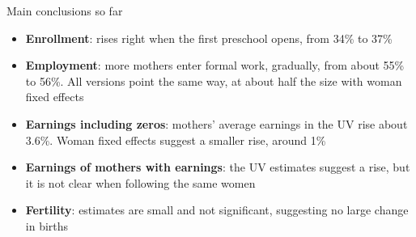 \documentclass[aspectratio=169,10pt]{beamer}
\newcommand{\takeaway}[1]{\par\vspace{6pt}{\small\textcolor{steel}{$\Rightarrow$}\ \textbf{\textcolor{navy}{#1}}}}
\begin{document}
\begin{frame}{Main conclusions so far}
\begin{itemize}
  \small
  \item \textbf{Enrollment}: rises right when the first preschool opens, from 34\% to 37\%
  \item \textbf{Employment}: more mothers enter formal work, gradually, from about 55\% to 56\%. All versions point the same way, at about half the size with woman fixed effects
  \item \textbf{Earnings including zeros}: mothers' average earnings in the UV rise about 3.6\%. Woman fixed effects suggest a smaller rise, around 1\%
  \item \textbf{Earnings of mothers with earnings}: the UV estimates suggest a rise, but it is not clear when following the same women
  \item \textbf{Fertility}: estimates are small and not significant, suggesting no large change in births
\end{itemize}
\takeaway{Openings bring children into preschool right away and mothers into formal work gradually, with no clear change in births.}
\end{frame}
\end{document}
